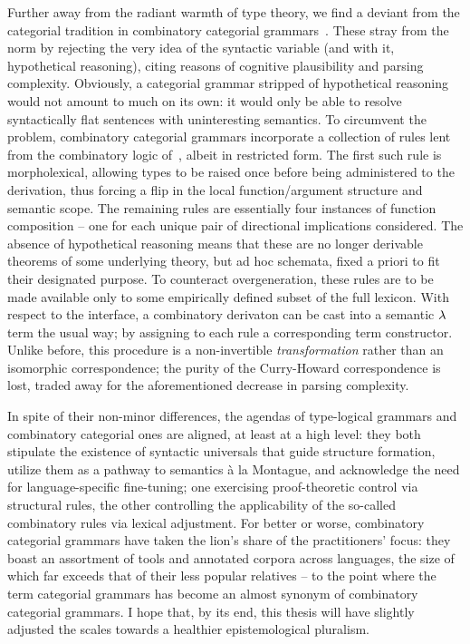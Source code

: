 Further away from the radiant warmth of type theory, we find a deviant from the categorial tradition in combinatory categorial grammars~\cite{ades1982order,szabolcsi1989bound, steedman2022combinatory}.
These stray from the norm by rejecting the very idea of the syntactic variable (and with it, hypothetical reasoning), citing reasons of cognitive plausibility and parsing complexity.
Obviously, a categorial grammar stripped of hypothetical reasoning would not amount to much on its own: it would only be able to resolve syntactically flat sentences with uninteresting semantics.
To circumvent the problem, combinatory categorial grammars incorporate a collection of rules lent from the combinatory logic of~\citet{curry1958combinatory}, albeit in restricted form.
The first such rule is morpholexical, allowing types to be raised once before being administered to the derivation, thus forcing a flip in the local function/argument structure and semantic scope.
The remaining rules are essentially four instances of function composition -- one for each unique pair of directional implications considered.
The absence of hypothetical reasoning means that these are no longer derivable theorems of some underlying theory, but ad hoc schemata, fixed a priori to fit their designated purpose.
To counteract overgeneration, these rules are to be made available only to some empirically defined subset of the full lexicon.
With respect to the interface, a combinatory derivaton can be cast into a semantic $\mathnormal{\lambda}$ term the usual way; by assigning to each rule a corresponding term constructor.
Unlike before, this procedure is a non-invertible \textit{transformation} rather than an isomorphic correspondence; the purity of the Curry-Howard correspondence is lost, traded away for the aforementioned decrease in parsing complexity.

In spite of their non-minor differences, the agendas of type-logical grammars and combinatory categorial ones are aligned, at least at a high level: they both stipulate the existence of syntactic universals that guide structure formation, utilize them as a pathway to semantics \`{a} la Montague, and acknowledge the need for language-specific fine-tuning; one exercising proof-theoretic control via structural rules, the other controlling the applicability of the so-called combinatory rules via lexical adjustment.
For better or worse, combinatory categorial grammars have taken the lion's share of the practitioners' focus: they boast an assortment of tools and annotated corpora across languages, the size of which far exceeds that of their less popular relatives -- to the point where the term categorial grammars has become an almost synonym of combinatory categorial grammars.
I hope that, by its end, this thesis will have slightly adjusted the scales towards a healthier epistemological pluralism.



